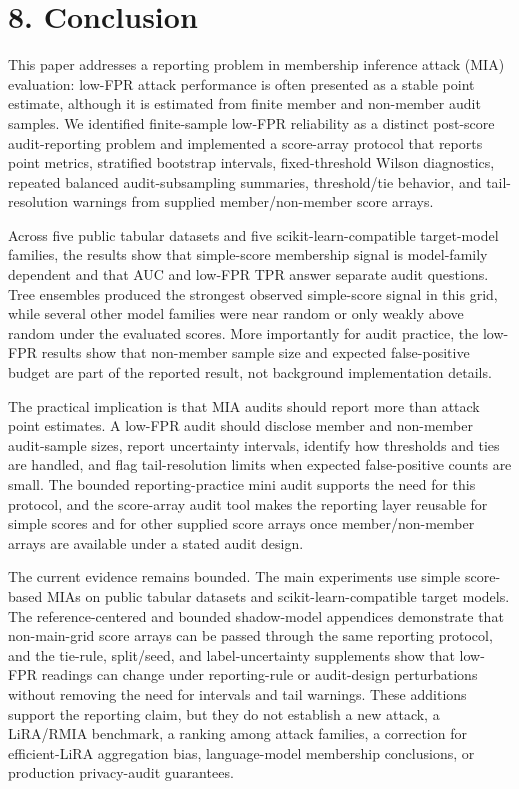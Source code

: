 \documentclass[
  10pt,
  twocolumn]{article}
\begin{document}
\hypertarget{conclusion}{%
\section{8. Conclusion}\label{conclusion}}

This paper addresses a reporting problem in membership inference attack (MIA) evaluation: low-FPR attack performance is often presented as a stable point estimate, although it is estimated from finite member and non-member audit samples. We identified finite-sample low-FPR reliability as a distinct post-score audit-reporting problem and implemented a score-array protocol that reports point metrics, stratified bootstrap intervals, fixed-threshold Wilson diagnostics, repeated balanced audit-subsampling summaries, threshold/tie behavior, and tail-resolution warnings from supplied member/non-member score arrays.

Across five public tabular datasets and five scikit-learn-compatible target-model families, the results show that simple-score membership signal is model-family dependent and that AUC and low-FPR TPR answer separate audit questions. Tree ensembles produced the strongest observed simple-score signal in this grid, while several other model families were near random or only weakly above random under the evaluated scores. More importantly for audit practice, the low-FPR results show that non-member sample size and expected false-positive budget are part of the reported result, not background implementation details.

The practical implication is that MIA audits should report more than attack point estimates. A low-FPR audit should disclose member and non-member audit-sample sizes, report uncertainty intervals, identify how thresholds and ties are handled, and flag tail-resolution limits when expected false-positive counts are small. The bounded reporting-practice mini audit supports the need for this protocol, and the score-array audit tool makes the reporting layer reusable for simple scores and for other supplied score arrays once member/non-member arrays are available under a stated audit design.

The current evidence remains bounded. The main experiments use simple score-based MIAs on public tabular datasets and scikit-learn-compatible target models. The reference-centered and bounded shadow-model appendices demonstrate that non-main-grid score arrays can be passed through the same reporting protocol, and the tie-rule, split/seed, and label-uncertainty supplements show that low-FPR readings can change under reporting-rule or audit-design perturbations without removing the need for intervals and tail warnings. These additions support the reporting claim, but they do not establish a new attack, a LiRA/RMIA benchmark, a ranking among attack families, a correction for efficient-LiRA aggregation bias, language-model membership conclusions, or production privacy-audit guarantees.
\end{document}
